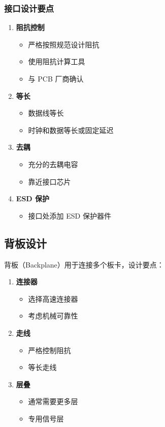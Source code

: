 \subsubsection{接口设计要点}

\begin{enumerate}
  \item \textbf{阻抗控制}
    \begin{itemize}
      \item 严格按照规范设计阻抗
      \item 使用阻抗计算工具
      \item 与 PCB 厂商确认
    \end{itemize}

  \item \textbf{等长}
    \begin{itemize}
      \item 数据线等长
      \item 时钟和数据等长或固定延迟
    \end{itemize}

  \item \textbf{去耦}
    \begin{itemize}
      \item 充分的去耦电容
      \item 靠近接口芯片
    \end{itemize}

  \item \textbf{ESD 保护}
    \begin{itemize}
      \item 接口处添加 ESD 保护器件
    \end{itemize}
\end{enumerate}

\subsection{背板设计}

背板（Backplane）用于连接多个板卡，设计要点：

\begin{enumerate}
  \item \textbf{连接器}
    \begin{itemize}
      \item 选择高速连接器
      \item 考虑机械可靠性
    \end{itemize}

  \item \textbf{走线}
    \begin{itemize}
      \item 严格控制阻抗
      \item 等长走线
    \end{itemize}

  \item \textbf{层叠}
    \begin{itemize}
      \item 通常需要更多层
      \item 专用信号层
    \end{itemize}
\end{enumerate}

